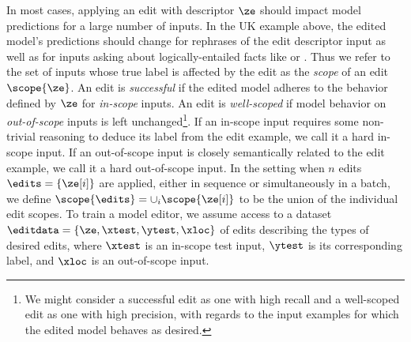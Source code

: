 In most cases, applying an edit with descriptor $\ze$ should impact model predictions for a large number of inputs. 
In the UK example above, the edited model's predictions should change for rephrases of the edit descriptor input as well as for inputs asking about logically-entailed facts like  or . Thus we refer to the set of inputs whose true label is affected by the edit as the \textit{scope} of an edit $\scope{\ze}$. An edit is \textit{successful} if the edited model adheres to the behavior defined by $\ze$ for \textit{in-scope} inputs. An edit is \textit{well-scoped} if model behavior on \textit{out-of-scope} inputs is left unchanged\footnote{We might consider a successful edit as one with high recall and a well-scoped edit as one with high precision, with regards to the input examples for which the edited model behaves as desired.}. If an in-scope input requires some non-trivial reasoning to deduce its label from the edit example, we call it a hard in-scope input.
If an out-of-scope input is closely semantically related to the edit example, we call it a hard out-of-scope input.
In the setting when $n$ edits $\edits = \{\ze[i]\}$ are applied, either in sequence or simultaneously in a batch, we define $\scope{\edits} = \cup_i \scope{\ze[i]}$ to be the union of the individual edit scopes.
To train a model editor, we assume access
to a dataset $\editdata =\{\ze, \xtest, \ytest, \xloc\}$
of edits describing the types of desired edits, where $\xtest$ is an in-scope test input,
$\ytest$ is its corresponding label, and $\xloc$ is an out-of-scope input.

